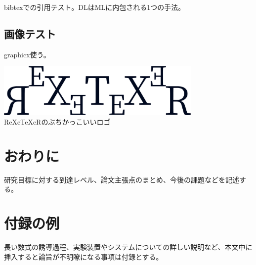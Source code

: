 \documentclass[a4paper, xelatex]{bxjsarticle}
\begin{document}
  bibtexでの引用テスト。DL\cite{lecun2015deep}はML\cite{michie1994machine}に内包される1つの手法。

  \subsection{画像テスト}
  graphicx使う。
  \begin{center}
    \includegraphics[width=10cm]{img/logo.png} \\
    ReXeTeXeRのぶちかっこいいロゴ
  \end{center}

  \section{おわりに}
  研究目標に対する到達レベル、論文主張点のまとめ、今後の課題などを記述する。

  
  

  \appendix
  \section{付録の例}
  長い数式の誘導過程、実験装置やシステムについての詳しい説明など、本文中に挿入すると論旨が不明瞭になる事項は付録とする。
\end{document}
